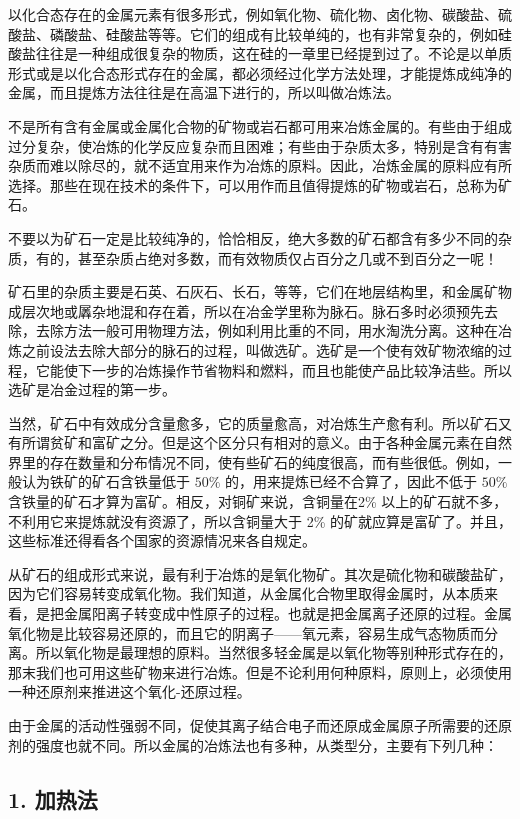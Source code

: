 以化合态存在的金属元素有很多形式，例如氧化物、硫化物、卤化物、碳酸盐、硫酸盐、磷酸盐、硅酸盐等等。它们的组成有比较单纯的，也有非常复杂的，例如硅酸盐往往是一种组成很复杂的物质，这在硅的一章里已经提到过了。不论是以单质形式或是以化合态形式存在的金属，都必须经过化学方法处理，才能提炼成纯净的金属，而且提炼方法往往是在高温下进行的，所以叫做冶炼法。

不是所有含有金属或金属化合物的矿物或岩石都可用来冶炼金属的。有些由于组成过分复杂，使冶炼的化学反应复杂而且困难；有些由于杂质太多，特别是含有有害杂质而难以除尽的，就不适宜用来作为冶炼的原料。因此，冶炼金属的原料应有所选择。那些在现在技术的条件下，可以用作而且值得提炼的矿物或岩石，总称为矿石。

不要以为矿石一定是比较纯净的，恰恰相反，绝大多数的矿石都含有多少不同的杂质，有的，甚至杂质占绝对多数，而有效物质仅占百分之几或不到百分之一呢！

矿石里的杂质主要是石英、石灰石、长石，等等，它们在地层结构里，和金属矿物成层次地或羼杂地混和存在着，所以在冶金学里称为脉石。脉石多时必须预先去除，去除方法一般可用物理方法，例如利用比重的不同，用水淘洗分离。这种在冶炼之前设法去除大部分的脉石的过程，叫做选矿。选矿是一个使有效矿物浓缩的过程，它能使下一步的冶炼操作节省物料和燃料，而且也能使产品比较净洁些。所以选矿是冶金过程的第一步。

当然，矿石中有效成分含量愈多，它的质量愈高，对冶炼生产愈有利。所以矿石又有所谓贫矿和富矿之分。但是这个区分只有相对的意义。由于各种金属元素在自然界里的存在数量和分布情况不同，使有些矿石的纯度很高，而有些很低。例如，一般认为铁矿的矿石含铁量低于
\(50 \%\) 的，用来提炼已经不合算了，因此不低于 \(50 \%\)
含铁量的矿石才算为富矿。相反，对铜矿来说，含铜量在2\%
以上的矿石就不多，不利用它来提炼就没有资源了，所以含铜量大于 2\%
的矿就应算是富矿了。并且，这些标准还得看各个国家的资源情况来各自规定。

从矿石的组成形式来说，最有利于冶炼的是氧化物矿。其次是硫化物和碳酸盐矿，因为它们容易转变成氧化物。我们知道，从金属化合物里取得金属时，从本质来看，是把金属阳离子转变成中性原子的过程。也就是把金属离子还原的过程。金属氧化物是比较容易还原的，而且它的阴离子------氧元素，容易生成气态物质而分离。所以氧化物是最理想的原料。当然很多轻金属是以氧化物等别种形式存在的，那末我们也可用这些矿物来进行冶炼。但是不论利用何种原料，原则上，必须使用一种还原剂来推进这个氧化-还原过程。

由于金属的活动性强弱不同，促使其离子结合电子而还原成金属原子所需要的还原剂的强度也就不同。所以金属的冶炼法也有多种，从类型分，主要有下列几种：

\subsection{1. 加热法}

